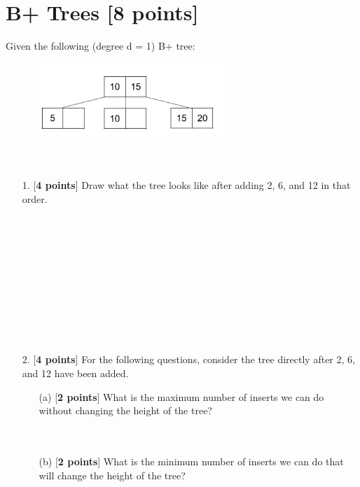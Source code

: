 \documentclass[10pt]{article}
\begin{document}
\section{B+ Trees \textbf{[8 points]}}
Given the following (degree d = 1) B+ tree:
\begin{figure}[h]\centering\includegraphics[height=3cm]{b+tree.png}\end{figure}\\
\begin{enumerate}
    \item[1. ] [\textbf{4 points}]  Draw what the tree looks like after adding 2, 6, and 12 in that order.\\ \\ \\ \\ \\ \\ \\ \\ \\ \\ \\
    \item[2.] [\textbf{4 points}]
        \noindent For the following questions, consider the tree directly after 2, 6, and 12 have been added.
        \begin{enumerate}
            \item[(a)] [\textbf{2 points}] What is the maximum number of inserts we can do without changing the height of the tree?\\ \\ \\
                \item[(b)][\textbf{2 points}] What is the minimum number of inserts we can do that will change the height of the tree?\\ \\ \\ \\ \\ \\
        \end{enumerate}
\end{enumerate}
\end{document}
